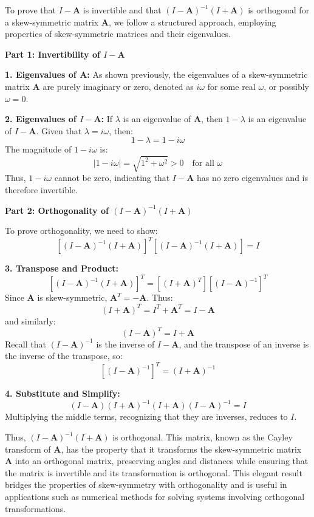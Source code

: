 \documentclass[8pt]{article}
\begin{document}
{To prove that \(I - \mathbf{A}\) is invertible and that \((I - \mathbf{A})^{-1}(I + \mathbf{A})\) is orthogonal for a skew-symmetric matrix \(\mathbf{A}\), we follow a structured approach, employing properties of skew-symmetric matrices and their eigenvalues.

\textbf{Part 1: Invertibility of \(I - \mathbf{A}\)}

\textbf{1. Eigenvalues of \(\mathbf{A}\):}
   As shown previously, the eigenvalues of a skew-symmetric matrix \(\mathbf{A}\) are purely imaginary or zero, denoted as \(i\omega\) for some real \(\omega\), or possibly \(\omega = 0\).

\textbf{2. Eigenvalues of \(I - \mathbf{A}\):}
   If \(\lambda\) is an eigenvalue of \(\mathbf{A}\), then \(1 - \lambda\) is an eigenvalue of \(I - \mathbf{A}\). Given that \(\lambda = i\omega\), then:
   \[
   1 - \lambda = 1 - i\omega
   \]
   The magnitude of \(1 - i\omega\) is:
   \[
   |1 - i\omega| = \sqrt{1^2 + \omega^2} > 0 \quad \text{for all } \omega
   \]
   Thus, \(1 - i\omega\) cannot be zero, indicating that \(I - \mathbf{A}\) has no zero eigenvalues and is therefore invertible.

\textbf{Part 2: Orthogonality of \((I - \mathbf{A})^{-1}(I + \mathbf{A})\)}

To prove orthogonality, we need to show:
\[
\left[(I - \mathbf{A})^{-1}(I + \mathbf{A})\right]^T \left[(I - \mathbf{A})^{-1}(I + \mathbf{A})\right] = I
\]

\textbf{3. Transpose and Product:}
   \[
   \left[(I - \mathbf{A})^{-1}(I + \mathbf{A})\right]^T = \left[(I + \mathbf{A})^T \right] \left[(I - \mathbf{A})^{-1}\right]^T
   \]
   Since \(\mathbf{A}\) is skew-symmetric, \(\mathbf{A}^T = -\mathbf{A}\). Thus:
   \[
   (I + \mathbf{A})^T = I^T + \mathbf{A}^T = I - \mathbf{A}
   \]
   and similarly:
   \[
   (I - \mathbf{A})^T = I + \mathbf{A}
   \]
   Recall that \((I - \mathbf{A})^{-1}\) is the inverse of \(I - \mathbf{A}\), and the transpose of an inverse is the inverse of the transpose, so:
   \[
   \left[(I - \mathbf{A})^{-1}\right]^T = (I + \mathbf{A})^{-1}
   \]

\textbf{4. Substitute and Simplify:}
   \[
   (I - \mathbf{A}) (I + \mathbf{A})^{-1} (I + \mathbf{A}) (I - \mathbf{A})^{-1} = I
   \]
   Multiplying the middle terms, recognizing that they are inverses, reduces to \(I\).

Thus, \((I - \mathbf{A})^{-1}(I + \mathbf{A})\) is orthogonal. This matrix, known as the Cayley transform of \(\mathbf{A}\), has the property that it transforms the skew-symmetric matrix \(\mathbf{A}\) into an orthogonal matrix, preserving angles and distances while ensuring that the matrix is invertible and its transformation is orthogonal. This elegant result bridges the properties of skew-symmetry with orthogonality and is useful in applications such as numerical methods for solving systems involving orthogonal transformations.

}
\end{document}

